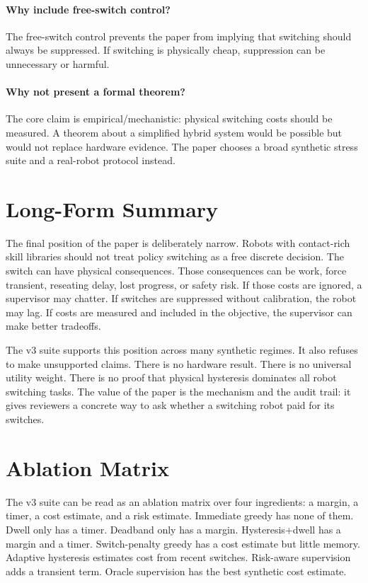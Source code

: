 \documentclass{article}
\begin{document}
\paragraph{Why include free-switch control?}
The free-switch control prevents the paper from implying that switching should always be suppressed.
If switching is physically cheap, suppression can be unnecessary or harmful.

\paragraph{Why not present a formal theorem?}
The core claim is empirical/mechanistic: physical switching costs should be measured.
A theorem about a simplified hybrid system would be possible but would not replace hardware evidence.
The paper chooses a broad synthetic stress suite and a real-robot protocol instead.

\section{Long-Form Summary}

The final position of the paper is deliberately narrow.
Robots with contact-rich skill libraries should not treat policy switching as a free discrete decision.
The switch can have physical consequences.
Those consequences can be work, force transient, reseating delay, lost progress, or safety risk.
If those costs are ignored, a supervisor may chatter.
If switches are suppressed without calibration, the robot may lag.
If costs are measured and included in the objective, the supervisor can make better tradeoffs.

The v3 suite supports this position across many synthetic regimes.
It also refuses to make unsupported claims.
There is no hardware result.
There is no universal utility weight.
There is no proof that physical hysteresis dominates all robot switching tasks.
The value of the paper is the mechanism and the audit trail: it gives reviewers a concrete way to ask whether a switching robot paid for its switches.

\section{Ablation Matrix}

The v3 suite can be read as an ablation matrix over four ingredients: a margin, a timer, a cost estimate, and a risk estimate.
Immediate greedy has none of them.
Dwell only has a timer.
Deadband only has a margin.
Hysteresis+dwell has a margin and a timer.
Switch-penalty greedy has a cost estimate but little memory.
Adaptive hysteresis estimates cost from recent switches.
Risk-aware supervision adds a transient term.
Oracle supervision has the best synthetic cost estimate.
\end{document}
